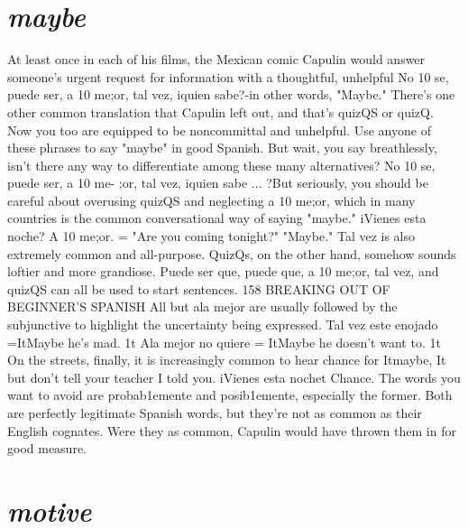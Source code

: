 {{{{\section{\emph{maybe}}

At least once in each of his films, the Mexican comic Capulin would answer someone's urgent request for information with a
thoughtful, unhelpful No 10 se, puede ser, a 10 me;or, tal vez, iquien
sabe?-in other words, "Maybe." There's one other common translation that Capulin left out, and that's quizQS or quizQ. Now you too
are equipped to be noncommittal and unhelpful. Use anyone of these
phrases to say "maybe" in good Spanish.
But wait, you say breathlessly, isn't there any way to differentiate among these many alternatives? No 10 se, puede ser, a 10 me-
;or, tal vez, iquien sabe ... ?But seriously, you should be careful about
overusing quizQS and neglecting a 10 me;or, which in many countries
is the common conversational way of saying "maybe." iVienes esta
noche? A 10 me;or. = "Are you coming tonight?" "Maybe." Tal vez is
also extremely common and all-purpose. QuizQs, on the other hand,
somehow sounds loftier and more grandiose. Puede ser que, puede
que, a 10 me;or, tal vez, and quizQS can all be used to start sentences.
158 BREAKING OUT OF BEGINNER'S SPANISH
All but ala mejor are usually followed by the subjunctive to highlight
the uncertainty being expressed. Tal vez este enojado =ItMaybe he's
mad. 1t Ala mejor no quiere = ItMaybe he doesn't want to. 1t On the
streets, finally, it is increasingly common to hear chance for Itmaybe, It
but don't tell your teacher I told you. iVienes esta nochet Chance. The
words you want to avoid are probab1emente and posib1emente, especially the former. Both are perfectly legitimate Spanish words, but
they're not as common as their English cognates. Were they as common, Capulin would have thrown them in for good measure.

\section{\emph{motive}}

}}}}
